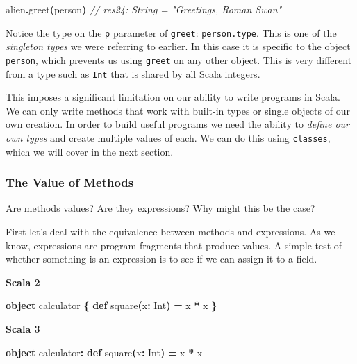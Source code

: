 \documentclass[11pt,a5paper,]{book}
\newenvironment{Shaded}{\begin{snugshade}}{\end{snugshade}}
\newcommand{\BuiltInTok}[1]{#1}
\newcommand{\CommentTok}[1]{\textcolor[rgb]{0.56,0.35,0.01}{\textit{#1}}}
\newcommand{\FunctionTok}[1]{\textcolor[rgb]{0.00,0.00,0.00}{#1}}
\newcommand{\KeywordTok}[1]{\textcolor[rgb]{0.13,0.29,0.53}{\textbf{#1}}}
\newcommand{\NormalTok}[1]{#1}
\newcommand{\OperatorTok}[1]{\textcolor[rgb]{0.81,0.36,0.00}{\textbf{#1}}}
\begin{document}
\begin{Shaded}
\begin{Highlighting}[]
\NormalTok{alien}\OperatorTok{.}\FunctionTok{greet}\OperatorTok{(}\NormalTok{person}\OperatorTok{)}
\CommentTok{// res24: String = "Greetings, Roman Swan"}
\end{Highlighting}
\end{Shaded}

Notice the type on the \texttt{p} parameter of \texttt{greet}:
\texttt{person.type}. This is one of the \emph{singleton types} we were
referring to earlier. In this case it is specific to the object
\texttt{person}, which prevents us using \texttt{greet} on any other
object. This is very different from a type such as \texttt{Int} that is
shared by all Scala integers.

This imposes a significant limitation on our ability to write programs
in Scala. We can only write methods that work with built-in types or
single objects of our own creation. In order to build useful programs we
need the ability to \emph{define our own types} and create multiple
values of each. We can do this using \texttt{classes}, which we will
cover in the next section.

\hypertarget{the-value-of-methods}{%
\subsubsection{The Value of Methods}\label{the-value-of-methods}}

Are methods values? Are they expressions? Why might this be the case?

First let's deal with the equivalence between methods and expressions.
As we know, expressions are program fragments that produce values. A
simple test of whether something is an expression is to see if we can
assign it to a field.

\textbf{Scala 2}

\begin{Shaded}
\begin{Highlighting}[]
\KeywordTok{object}\NormalTok{ calculator }\OperatorTok{\{}
  \KeywordTok{def} \FunctionTok{square}\OperatorTok{(}\NormalTok{x}\OperatorTok{:} \BuiltInTok{Int}\OperatorTok{)} \OperatorTok{=}\NormalTok{ x }\OperatorTok{*}\NormalTok{ x}
\OperatorTok{\}}
\end{Highlighting}
\end{Shaded}

\textbf{Scala 3}

\begin{Shaded}
\begin{Highlighting}[]
\KeywordTok{object}\NormalTok{ calculator}\OperatorTok{:}
  \KeywordTok{def} \FunctionTok{square}\OperatorTok{(}\NormalTok{x}\OperatorTok{:} \BuiltInTok{Int}\OperatorTok{)} \OperatorTok{=}\NormalTok{ x }\OperatorTok{*}\NormalTok{ x}
\end{Highlighting}
\end{Shaded}
\end{document}
